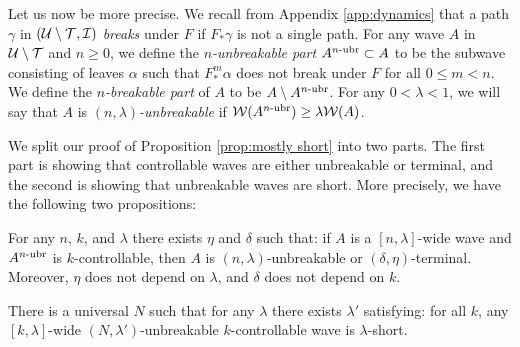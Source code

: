 \documentclass[12pt]{amsart}
\begin{document}
Let us now be more precise. 
We recall from Appendix \ref{app:dynamics} that a path $\gamma$ in $(\mathcal U\setminus \mathcal T, \mathcal I)$ \textit{breaks} under $F$ if $F_*\gamma$ is not a single path. 
For any wave $A$ in $\mathcal U\setminus \mathcal T$ and $n\geq 0$, we define the \textit{$n$-unbreakable part}  $A^{n\text{-}{\mathrm{ubr}}}\subset A$ to be the subwave consisting of leaves
$\alpha$ such that $F_*^m\alpha$ does not break under $F$ for all $0\leq m < n$. We define the \textit{$n$-breakable part}  of $A$ to be $A\setminus A^{n\text{-}{\mathrm{ubr}}}$. 
For any $0< \lambda < 1$, we will say that $A$ is  \textit{$(n, \lambda)$-unbreakable} if $\mathcal W(A^{n\text{-}{\mathrm{ubr}}})\geq \lambda\mathcal W(A)$. 

We split our proof of Proposition \ref{prop:mostly short} into two parts. The first part is showing that controllable waves are either unbreakable or terminal, and the second is showing that unbreakable waves are short. More precisely, we have the following two propositions:
\begin{prop}\label{prop:small breaking}
	For any $n$, $k$, and $\lambda$  there exists $\eta$ and $\delta$ such that: if $A$ is a $[n, \lambda]$-wide wave and $A^{n\text{-}{\mathrm{ubr}}}$ is $k$-controllable, then $A$ is  $(n, \lambda)$-unbreakable or $(\delta, \eta)$-terminal. Moreover, $\eta$ does not depend on  $\lambda$, and $\delta$ does not depend on $k$.
\end{prop}


\begin{prop}\label{prop:nonbreaking implies short}
	There is a universal $N$ such that for any $\lambda$ there exists $\lambda'$ satisfying: for all $k$, any $[k, \lambda]$-wide $(N, \lambda')$-unbreakable $k$-controllable wave is $\lambda$-short.
\end{prop}
\end{document}
